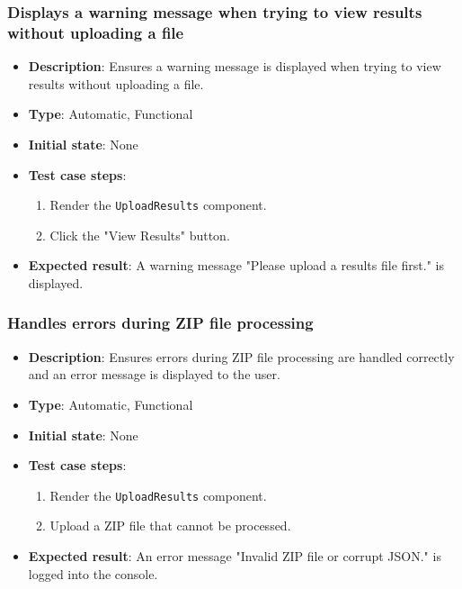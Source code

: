 \documentclass[12pt, titlepage]{article}
\begin{document}
\subsubsection{Displays a warning message when trying to view results without uploading a file}
\begin{itemize}
    \item \textbf{Description}: Ensures a warning message is displayed when trying to view results without uploading a file.
    \item \textbf{Type}: Automatic, Functional
    \item \textbf{Initial state}: None
    \item \textbf{Test case steps}:
    \begin{enumerate}
        \item Render the \texttt{UploadResults} component.
        \item Click the "View Results" button.
    \end{enumerate}
    \item \textbf{Expected result}: A warning message "Please upload a results file first." is displayed.
\end{itemize}

\subsubsection{Handles errors during ZIP file processing}
\begin{itemize}
    \item \textbf{Description}: Ensures errors during ZIP file processing are handled correctly and an error message is displayed to the user.
    \item \textbf{Type}: Automatic, Functional
    \item \textbf{Initial state}: None
    \item \textbf{Test case steps}:
    \begin{enumerate}
        \item Render the \texttt{UploadResults} component.
        \item Upload a ZIP file that cannot be processed.
    \end{enumerate}
    \item \textbf{Expected result}: An error message "Invalid ZIP file or corrupt JSON." is logged into the console.
\end{itemize}
\end{document}
